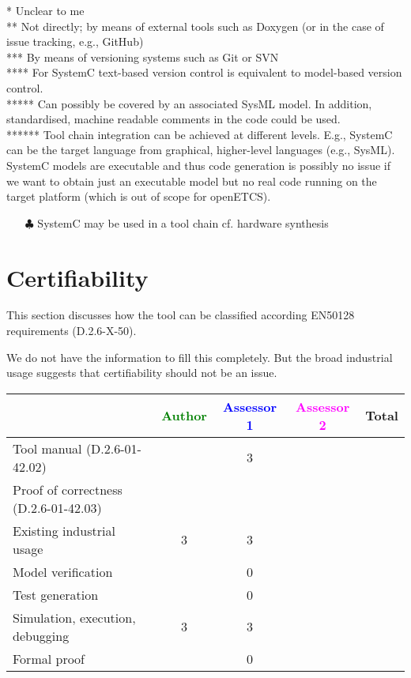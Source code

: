 \begin{author_comment}
  * Unclear to me\\
  ** Not directly; by means of external tools such as Doxygen (or in the case of issue tracking, e.g., GitHub)\\
 *** By means of versioning systems such as Git or SVN\\
**** For SystemC text-based version control is equivalent to model-based version control.\\
***** Can possibly be covered by an associated SysML model. In addition, standardised, machine readable comments in the code could be used.\\
****** Tool chain integration can be achieved at different levels. E.g., SystemC can be the target language from graphical, higher-level languages (e.g., SysML). SystemC models are executable and thus code generation is possibly no issue if we want to obtain just an executable model but no real code running on the target platform (which is out of scope for openETCS).
\end{author_comment}
\begin{assessor1}
\begin{itemize}
\item[$\clubsuit$] SystemC may be used in a tool chain cf. hardware synthesis
\end{itemize}
\end{assessor1}

\section{Certifiability}

This section discusses how the tool can be classified according EN50128 requirements (D.2.6-X-50).

\begin{author_comment}
  We do not have the information to fill this completely. But the broad industrial usage suggests that certifiability should not be an issue.
\end{author_comment}

\begin{tabular}{|l | c | c | c | c|}
\hline
& \textcolor{green}{Author} & \textcolor{blue}{Assessor 1} & \textcolor{magenta}{Assessor 2} & Total \\
\hline
Tool manual (D.2.6-01-42.02) & &3 & & \\
\hline
Proof of correctness (D.2.6-01-42.03) & & & & \\
\hline
Existing industrial usage &3 &3 & & \\
\hline
Model verification & &0 & & \\
\hline
Test generation & &0 & & \\
\hline
Simulation, execution, debugging &3 &3 & & \\
\hline
Formal proof & &0 & & \\
\hline
\end{tabular}

